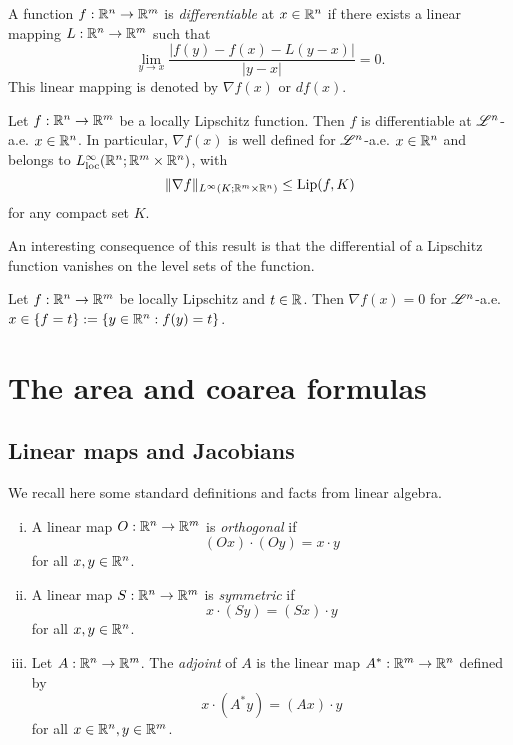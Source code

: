 \begin{definition}
A function $f : \mathbb{R}^{n} \to \mathbb{R}^{m}$ is {\em differentiable} at $x \in \mathbb{R}^{n}$ if there exists a linear mapping $L: \mathbb{R}^{n} \to \mathbb{R}^{m}$ such that
\begin{equation*}
\lim_{y \to x} \frac{|f(y) - f(x) - L(y - x)|}{|y - x|} = 0.
\end{equation*}
This linear mapping is denoted by $\nabla f(x)$ or $d f(x)$.
\end{definition}

\begin{theorem}
Let $f : \mathbb{R}^{n} \to \mathbb{R}^{m}$ be a locally Lipschitz function. Then $f$ is differentiable at $\mathscr{L}^{n}$-a.e. $x \in \mathbb{R}^{n}$. In particular, $\nabla f(x)$ is well defined for $\mathscr{L}^{n}$-a.e. $x \in \mathbb{R}^{n}$ and belongs to $L^{\infty}_{\rm loc}(\mathbb{R}^{n}; \mathbb{R}^{m} \times \mathbb{R}^{n})$, with $$\|\nabla f\|_{L^{\infty}(K; \mathbb{R}^{m} \times \mathbb{R}^{n})} \le \operatorname{Lip}(f, K)$$ for any compact set $K$.
\end{theorem}

An interesting consequence of this result is that the differential of a Lipschitz function vanishes on the level sets of the function.

\begin{theorem}
Let $f: \mathbb{R}^{n} \to \mathbb{R}^{m}$ be locally Lipschitz and $t \in \mathbb{R}$. Then $\nabla f(x) = 0$ for $\mathscr{L}^{n}$-a.e. $x \in \{ f = t\} := \{ y \in \mathbb{R}^{n}: f(y) = t\}$.
\end{theorem}

\section{The area and coarea formulas}


\subsection{Linear maps and Jacobians}

We recall here some standard definitions and facts from linear algebra.

\begin{definition} \hfill
\begin{enumerate}[i)]
\item A linear map $O : \mathbb{R}^{n} \to \mathbb{R}^{m}$ is {\em orthogonal} if $$(Ox) \cdot (Oy) = x \cdot y$$ for all $x, y \in \mathbb{R}^{n}$.
\item A linear map $S: \mathbb{R}^{n} \to \mathbb{R}^{m}$ is {\em symmetric} if $$x \cdot (Sy) = (Sx) \cdot y$$ for all $x, y \in \mathbb{R}^{n}$.
\item Let $A: \mathbb{R}^{n} \to \mathbb{R}^{m}$. The {\em adjoint} of $A$ is the linear map $A^{*}: \mathbb{R}^{m} \to \mathbb{R}^{n}$ defined by $$x \cdot (A^{*} y) = (Ax) \cdot y$$ for all $x \in \mathbb{R}^{n}, y \in \mathbb{R}^{m}$. 
\end{enumerate}
\end{definition}

